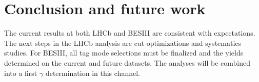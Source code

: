\documentclass[12pt, a4paper, notitlepage, onecolumn]{article}
\begin{document}
\section{Conclusion and future work}
\noindent The current results at both LHCb and BESIII are consistent with expectations. The next steps in the LHCb analysis are cut optimizations and systematics studies. For BESIII, all tag mode selections must be finalized and the yields determined on the current and future datasets. The analyses will be combined into a first $\gamma$ determination in this channel.



\end{document}
